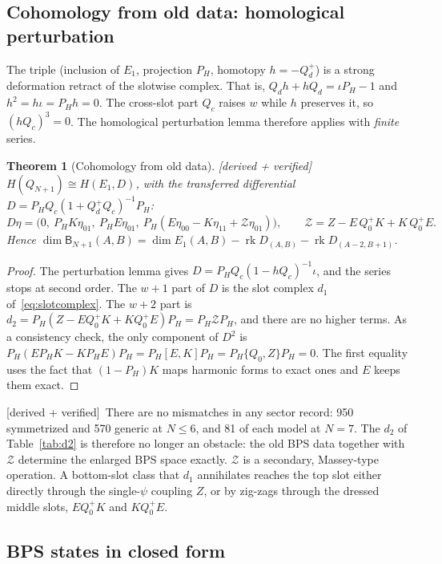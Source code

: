 \documentclass[11pt]{article}
\newcommand{\rk}{\operatorname{rk}}
\newcommand{\B}{\mathsf B}
\newcommand{\PH}{P_{\!H}}
\newcommand{\Zc}{\mathcal Z}
\newcommand{\tagbox}[2]{\textsf{\small\color{#1}[#2]}}
\newcommand{\VER}{\tagbox{cder}{derived + verified}}
\theoremstyle{plain}
\newtheorem{theorem}{Theorem}
\theoremstyle{remark}
\numberwithin{equation}{section}
\begin{document}
\subsection{Cohomology from old data: homological perturbation}

The triple (inclusion of $E_1$, projection $\PH$, homotopy $h=-Q_d^+$) is a strong deformation retract of the slotwise
complex. That is, $Q_dh+hQ_d=\iota\PH-1$ and $h^2=h\iota=\PH h=0$. The cross-slot part $Q_c$ raises $w$ while $h$
preserves it, so $(hQ_c)^3=0$. The homological perturbation lemma therefore applies with \emph{finite} series.

\begin{theorem}[Cohomology from old data]\label{thm:B}\VER\
$H(Q_{N+1})\cong H(E_1,D)$, with the transferred differential $D=\PH Q_c(1+Q_d^+Q_c)^{-1}\PH$:
\begin{equation}\label{eq:D}
D\eta=\big(0,\ \PH K\eta_{01},\ \PH E\eta_{01},\ \PH(E\eta_{00}-K\eta_{11}+\Zc\eta_{01})\big),\qquad
\Zc=Z-E\,Q_0^+K+K\,Q_0^+E .
\end{equation}
Hence $\dim\B_{N+1}(A,B)=\dim E_1(A,B)-\rk D_{(A,B)}-\rk D_{(A-2,B+1)}$.
\end{theorem}
\begin{proof}
The perturbation lemma gives $D=\PH Q_c(1-hQ_c)^{-1}\iota$, and the series stops at second order. The $w{+}1$ part of
$D$ is the slot complex $d_1$ of~\eqref{eq:slotcomplex}. The $w{+}2$ part is
$d_2=\PH(Z-EQ_0^+K+KQ_0^+E)\PH=\PH\Zc\PH$, and there are no higher terms. As a consistency check, the only
component of $D^2$ is $\PH(E\PH K-K\PH E)\PH=\PH[E,K]\PH=\PH\{Q_0,Z\}\PH=0$. The first equality uses the fact that
$(1-\PH)K$ maps harmonic forms to exact ones and $E$ keeps them exact.
\end{proof}

\VER\ There are no mismatches in any sector record: 950 symmetrized and 570 generic at $N\le6$, and 81 of each model at
$N=7$. The
$d_2$ of Table~\ref{tab:d2} is therefore no longer an obstacle: the old BPS data together with $\Zc$ determine the
enlarged BPS space exactly. $\Zc$ is a secondary, Massey-type operation. A bottom-slot class that $d_1$ annihilates
reaches the top slot either directly through the single-$\psi$ coupling $Z$, or by zig-zags through the dressed middle
slots, $EQ_0^+K$ and $KQ_0^+E$.

\subsection{BPS states in closed form}
\end{document}
